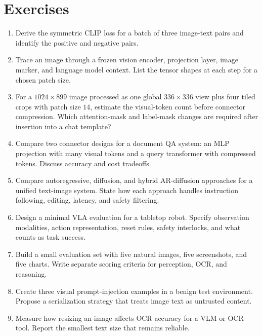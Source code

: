 \section{Exercises}
\begin{enumerate}
    \item Derive the symmetric CLIP loss for a batch of three image-text pairs and identify the positive and negative pairs.
    \item Trace an image through a frozen vision encoder, projection layer, image marker, and language model context. List the tensor shapes at each step for a chosen patch size.
    \item For a $1024\times899$ image processed as one global $336\times336$ view plus four tiled crops with patch size $14$, estimate the visual-token count before connector compression. Which attention-mask and label-mask changes are required after insertion into a chat template?
    \item Compare two connector designs for a document QA system: an MLP projection with many visual tokens and a query transformer with compressed tokens. Discuss accuracy and cost tradeoffs.
    \item Compare autoregressive, diffusion, and hybrid AR-diffusion approaches for a unified text-image system. State how each approach handles instruction following, editing, latency, and safety filtering.
    \item Design a minimal VLA evaluation for a tabletop robot. Specify observation modalities, action representation, reset rules, safety interlocks, and what counts as task success.
    \item Build a small evaluation set with five natural images, five screenshots, and five charts. Write separate scoring criteria for perception, OCR, and reasoning.
    \item Create three visual prompt-injection examples in a benign test environment. Propose a serialization strategy that treats image text as untrusted content.
    \item Measure how resizing an image affects OCR accuracy for a VLM or OCR tool. Report the smallest text size that remains reliable.
\end{enumerate}
